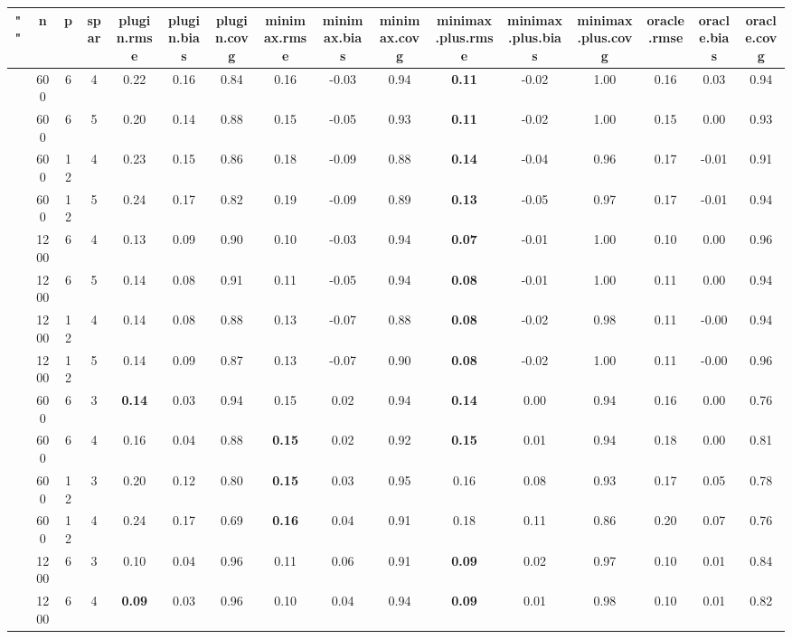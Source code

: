 \begin{table}[ht]
\centering
\begin{tabular}{||c|ccc||ccc|ccc|ccc|ccc}
  \hline
\hline
"" & n & p & spar & plugin.rmse & plugin.bias & plugin.covg & minimax.rmse & minimax.bias & minimax.covg & minimax.plus.rmse & minimax.plus.bias & minimax.plus.covg & oracle.rmse & oracle.bias & oracle.covg \\ 
  \hline
 & 600 & 6 & 4 & 0.22 & 0.16 & 0.84 & 0.16 & -0.03 & 0.94 & \bf 0.11 & -0.02 & 1.00 & 0.16 & 0.03 & 0.94 \\ 
   & 600 & 6 & 5 & 0.20 & 0.14 & 0.88 & 0.15 & -0.05 & 0.93 & \bf 0.11 & -0.02 & 1.00 & 0.15 & 0.00 & 0.93 \\ 
   & 600 & 12 & 4 & 0.23 & 0.15 & 0.86 & 0.18 & -0.09 & 0.88 & \bf 0.14 & -0.04 & 0.96 & 0.17 & -0.01 & 0.91 \\ 
   & 600 & 12 & 5 & 0.24 & 0.17 & 0.82 & 0.19 & -0.09 & 0.89 & \bf 0.13 & -0.05 & 0.97 & 0.17 & -0.01 & 0.94 \\ 
   & 1200 & 6 & 4 & 0.13 & 0.09 & 0.90 & 0.10 & -0.03 & 0.94 & \bf 0.07 & -0.01 & 1.00 & 0.10 & 0.00 & 0.96 \\ 
   & 1200 & 6 & 5 & 0.14 & 0.08 & 0.91 & 0.11 & -0.05 & 0.94 & \bf 0.08 & -0.01 & 1.00 & 0.11 & 0.00 & 0.94 \\ 
   & 1200 & 12 & 4 & 0.14 & 0.08 & 0.88 & 0.13 & -0.07 & 0.88 & \bf 0.08 & -0.02 & 0.98 & 0.11 & -0.00 & 0.94 \\ 
   & 1200 & 12 & 5 & 0.14 & 0.09 & 0.87 & 0.13 & -0.07 & 0.90 & \bf 0.08 & -0.02 & 1.00 & 0.11 & -0.00 & 0.96 \\ 
   \hline
 & 600 & 6 & 3 & \bf 0.14 & 0.03 & 0.94 & 0.15 & 0.02 & 0.94 & \bf 0.14 & 0.00 & 0.94 & 0.16 & 0.00 & 0.76 \\ 
   & 600 & 6 & 4 & 0.16 & 0.04 & 0.88 & \bf 0.15 & 0.02 & 0.92 & \bf 0.15 & 0.01 & 0.94 & 0.18 & 0.00 & 0.81 \\ 
   & 600 & 12 & 3 & 0.20 & 0.12 & 0.80 & \bf 0.15 & 0.03 & 0.95 & 0.16 & 0.08 & 0.93 & 0.17 & 0.05 & 0.78 \\ 
   & 600 & 12 & 4 & 0.24 & 0.17 & 0.69 & \bf 0.16 & 0.04 & 0.91 & 0.18 & 0.11 & 0.86 & 0.20 & 0.07 & 0.76 \\ 
   & 1200 & 6 & 3 & 0.10 & 0.04 & 0.96 & 0.11 & 0.06 & 0.91 & \bf 0.09 & 0.02 & 0.97 & 0.10 & 0.01 & 0.84 \\ 
   & 1200 & 6 & 4 & \bf 0.09 & 0.03 & 0.96 & 0.10 & 0.04 & 0.94 & \bf 0.09 & 0.01 & 0.98 & 0.10 & 0.01 & 0.82 \\ 

\end{tabular}
\end{table}
